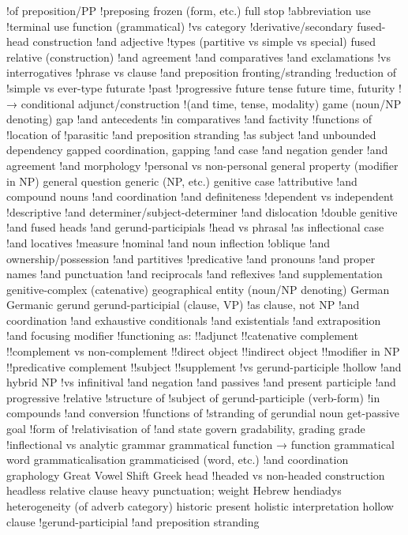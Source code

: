 !of preposition/PP
!preposing
frozen (form, etc.)
full stop
!abbreviation use
!terminal use
function (grammatical)
!vs category
!derivative/secondary
fused-head construction
!and adjective
!types (partitive vs simple vs special)
fused relative (construction)
!and agreement
!and comparatives
!and exclamations
!vs interrogatives
!phrase vs clause
!and preposition fronting/stranding
!reduction of
!simple vs ever-type
futurate
!past
!progressive
future tense
future time, futurity
!→ conditional adjunct/construction
!(and time, tense, modality)
game (noun/NP denoting)
gap
!and antecedents
!in comparatives
!and factivity
!functions of
!location of
!parasitic
!and preposition stranding
!as subject
!and unbounded dependency
gapped coordination, gapping
!and case
!and negation
gender
!and agreement
!and morphology
!personal vs non-personal
general property (modifier in NP)
general question
generic (NP, etc.)
genitive case
!attributive
!and compound nouns
!and coordination
!and definiteness
!dependent vs independent
!descriptive
!and determiner/subject-determiner
!and dislocation
!double genitive
!and fused heads
!and gerund-participials
!head vs phrasal
!as inflectional case
!and locatives
!measure
!nominal
!and noun inflection
!oblique
!and ownership/possession
!and partitives
!predicative
!and pronouns
!and proper names
!and punctuation
!and reciprocals
!and reflexives
!and supplementation
genitive-complex (catenative)
geographical entity (noun/NP denoting)
German
Germanic
gerund
gerund-participial (clause, VP)
!as clause, not NP
!and coordination
!and exhaustive conditionals
!and existentials
!and extraposition
!and focusing modifier
!functioning as:
!!adjunct
!!catenative complement
!!complement vs non-complement
!!direct object
!!indirect object
!!modifier in NP
!!predicative complement
!!subject
!!supplement
!vs gerund-participle
!hollow
!and hybrid NP
!vs infinitival
!and negation
!and passives
!and present participle
!and progressive
!relative
!structure of
!subject of
gerund-participle (verb-form)
!in compounds
!and conversion
!functions of
!stranding of
gerundial noun
get-passive
goal
!form of
!relativisation of
!and state
govern
gradability, grading
grade
!inflectional vs analytic
grammar
grammatical function → function
grammatical word
grammaticalisation
grammaticised (word, etc.)
!and coordination
graphology
Great Vowel Shift
Greek
head
!headed vs non-headed construction
headless relative clause
heavy punctuation; weight
Hebrew
hendiadys
heterogeneity (of adverb category)
historic present
holistic interpretation
hollow clause
!gerund-participial
!and preposition stranding
